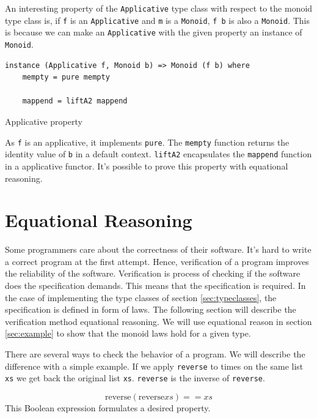 \documentclass[twoside, a4paper, 12pt]{article}
\begin{document}
An interesting property of the \verb|Applicative| type class with respect to the monoid type class is, if \verb|f| is an \verb|Applicative| and \verb|m| is a \verb|Monoid|, \verb|f b| is also a \verb|Monoid|. This is because we can make an \verb|Applicative| with the given property an instance of \verb|Monoid|.
\begin{program}
\begin{verbatim}
instance (Applicative f, Monoid b) => Monoid (f b) where
    mempty = pure mempty

    mappend = liftA2 mappend
\end{verbatim}
\label{lst:applicative2monoid}
\caption{Applicative property}
\end{program}

As \verb|f| is an applicative, it implements \verb|pure|. The \verb|mempty| function returns the identity value of \verb|b| in a default context. \verb|liftA2| encapsulates the \verb|mappend| function in a applicative functor. It's possible to prove this property with equational reasoning.

\section{Equational Reasoning}
\label{sec:equationalreasoning}

Some programmers care about the correctness of their software. It's hard to write a correct program at the first attempt. 
Hence, verification of a program improves the reliability of the software. Verification is process of checking if the software does the specification demands. This means that the specification is required. In the case of implementing the type classes of section \ref{sec:typeclasses}, the specification is defined in form of laws. The following section will describe the verification method equational reasoning. We will use equational reason in section \ref{sec:example} to show that the monoid laws hold for a given type.

There are several ways to check the behavior of a program. 
We will describe the difference with a simple example.
If we apply \verb|reverse| to times on the same list \verb|xs| we get back the original list \verb|xs|. \verb|reverse| is the inverse of \verb|reverse|. 

\begin{equation}
  \label{eq:reverse_prop}
\text{reverse} (\text{reverse} xs) == xs  
\end{equation}
This Boolean expression formulates a desired property. 
\end{document}
